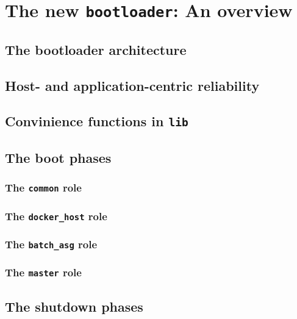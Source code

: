 \chapter{The new \texttt{bootloader}: An overview}
	\section{The bootloader architecture}
	\section{Host- and application-centric reliability}
	\section{Convinience functions in \texttt{lib}}
	\section{The boot phases}
		\subsection{The \texttt{common} role}
		\subsection{The \texttt{docker\_host} role}
		\subsection{The \texttt{batch\_asg} role}
		\subsection{The \texttt{master} role}
	\section{The shutdown phases}